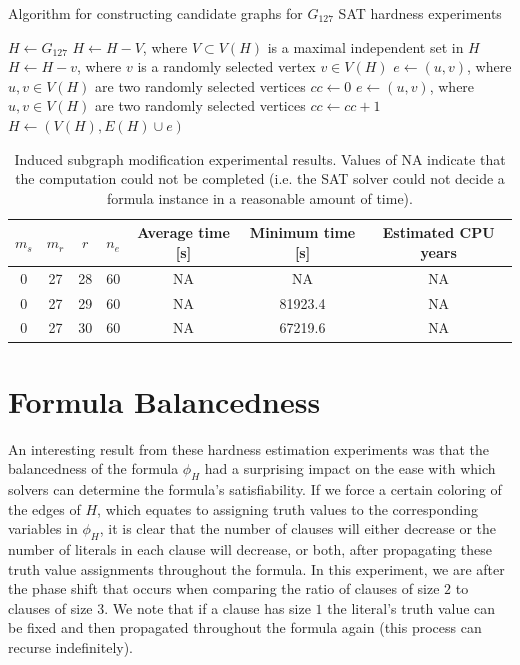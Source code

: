 \documentclass[paper=a4, fontsize=11pt]{scrartcl} %
\begin{document}
\begin{algorithm}[t] %
\caption{Algorithm for constructing candidate graphs for $G_{127}$ SAT hardness experiments} \label{alg:experimentGraphBuilder}
\begin{algorithmic}[1]
\State $H \gets G_{127}$
	\State $H \gets H - V$, where $V \subset V(H)$ is a maximal independent set in $H$
\EndFor
{}
	\State $H \gets H - v$, where $v$ is a randomly selected vertex $v \in V(H)$
\EndFor
{}
	\State $e \gets (u,v)$, where $u,v \in V(H)$ are two randomly selected vertices
	\State $cc \gets 0$
		\State $e \gets (u,v)$, where $u,v \in V(H)$ are two randomly selected vertices
		\State $cc \gets cc + 1$
	\EndWhile
	\Else
		\State $H \gets (V(H), E(H) \cup e)$
	\EndIf
\EndFor
\end{algorithmic}
\end{algorithm}

\begin{table}
	\caption{Induced subgraph modification experimental results. Values of NA indicate that the computation
	could not be completed (i.e. the SAT solver could not decide a formula instance in a reasonable
	amount of time).}
	\begin{tabular}{c | c | c | c | c | c | c}
		\hline
		$m_s$ & $m_r$ & $r$ & $n_e$ & Average time [s] & Minimum time [s] & Estimated CPU years \\ \hline
		0 & 27 & 28 & 60 & NA & NA & NA \\ \hline
		0 & 27 & 29 & 60 & NA & 81923.4 & NA \\ \hline
		0 & 27 & 30 & 60 & NA & 67219.6 & NA \\ 
		\hline
	\end{tabular}
	\label{tab:guidanceExperiment3}
\end{table}

\section{Formula Balancedness}
An interesting result from these hardness estimation experiments was that the 
balancedness of the formula $\phi_H$ had a surprising impact on the ease with
which solvers can determine the formula's satisfiability. If we force a certain
coloring of the edges of $H$, which equates to assigning truth values to
the corresponding variables in $\phi_H$, it is clear that the number of clauses
will either decrease or the number of literals in each clause will decrease, or both,
after propagating these truth value assignments throughout the formula. In this experiment,
we are after the phase shift that occurs when comparing the ratio of clauses of size $2$
to clauses of size $3$. We note that if a clause has size $1$ the literal's truth value
can be fixed and then propagated throughout the formula again (this process can recurse
indefinitely). 
\end{document}
